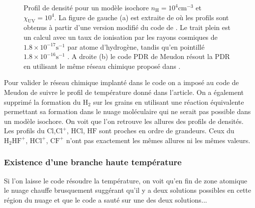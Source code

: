 \begin{figure}[htbp]
\begin{subfigure}[t]{0.45\textwidth}
        \caption{}
    \end{subfigure}
    \caption{Profil de densité pour un modèle isochore $n_\mathrm{H} = 10^4 \mathrm{cm}^{-3}$ et $\chi_\mathrm{UV} = 10^4$. La figure de gauche (a) est extraite de \cite{Neufire2009} où les profils sont obtenus à partir d'une version modifié du code de \cite{Kaufman2006}. Le trait plein est un calcul avec un taux de ionisation par les rayons cosmiques de $1.8 \times 10^{−17 } \mathrm{s}^{-1}$ par atome d'hydrogène, tandis qu'en pointillé $1.8 \times 10^{−16} \mathrm{s}^{-1}$ . A droite (b) le code PDR de Meudon résout la PDR en utilisant le même réseau chimique proposé dans \cite{Neufire2009}.}
\end{figure}

Pour valider le réseau chimique implanté dans le code on a imposé au code de Meudon de suivre le profil de température donné dans l'article. On a également supprimé la formation du $\mathrm{H}_2$ sur les grains en utilisant une réaction équivalente permettant sa formation dans le nuage moléculaire qui ne serait pas possible dans un modèle isochore. On voit que l'on retrouve les allures des profils de densités. Les profils du $\mathrm{Cl}$,$\mathrm{Cl}^+$, $\mathrm{HCl}$, $\mathrm{HF}$ sont proches en ordre de grandeurs. Ceux du $\mathrm{H}_2\mathrm{HF}^+$, $\mathrm{HCl}^+$, $\mathrm{CF}^+$ n'ont pas exactement les mêmes allures ni les mêmes valeurs. 

\subsubsection{Existence d'une branche haute température}

Si l'on laisse le code résoudre la température, on voit qu'en fin de zone atomique le nuage chauffe brusquement suggérant qu'il y a deux solutions possibles en cette région du nuage et que le code a sauté sur une des deux solutions...

